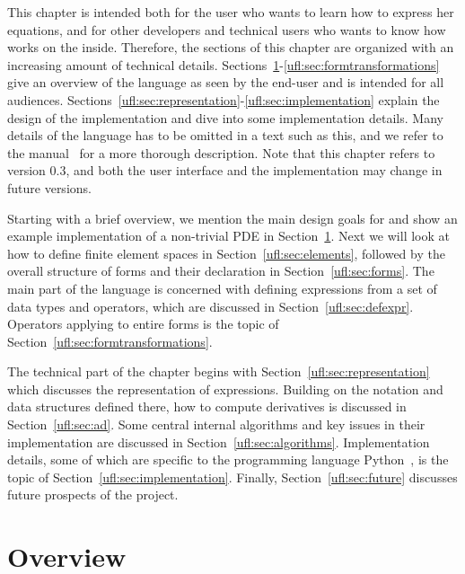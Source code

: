 This chapter is intended both for the \fenics{} user who wants to
learn how to express her equations, and for other \fenics{} developers
and technical users who wants to know how \ufl{} works on the inside.
Therefore, the sections of this chapter are organized with an
increasing amount of technical details.
Sections~\ref{ufl:sec:overview}-\ref{ufl:sec:formtransformations} give
an overview of the language as seen by the end-user and is intended
for all audiences.
Sections~\ref{ufl:sec:representation}-\ref{ufl:sec:implementation}
explain the design of the implementation and dive into some
implementation details.  Many details of the language has to be
omitted in a text such as this, and we refer to the \ufl{}
manual~\cite{manual:ufl} for a more thorough description. Note that
this chapter refers to \ufl{} version 0.3, and both the user interface
and the implementation may change in future versions.

Starting with a brief overview, we mention the main design goals for
\ufl{} and show an example implementation of a non-trivial PDE in
Section~\ref{ufl:sec:overview}.  Next we will look at how to define
finite element spaces in Section~\ref{ufl:sec:elements}, followed by
the overall structure of forms and their declaration in
Section~\ref{ufl:sec:forms}.  The main part of the language is
concerned with defining expressions from a set of data types and
operators, which are discussed in Section~\ref{ufl:sec:defexpr}.
Operators applying to entire forms is the topic of
Section~\ref{ufl:sec:formtransformations}.

The technical part of the chapter begins with
Section~\ref{ufl:sec:representation} which discusses the
representation of expressions.  Building on the notation and data
structures defined there, how to compute derivatives is discussed in
Section~\ref{ufl:sec:ad}.  Some central internal algorithms and key
issues in their implementation are discussed in
Section~\ref{ufl:sec:algorithms}.  Implementation details, some of
which are specific to the programming language
Python~\cite{www:python}, is the topic of
Section~\ref{ufl:sec:implementation}.  Finally,
Section~\ref{ufl:sec:future} discusses future prospects of the \ufl{}
project.

\section{Overview} \label{ufl:sec:overview}

